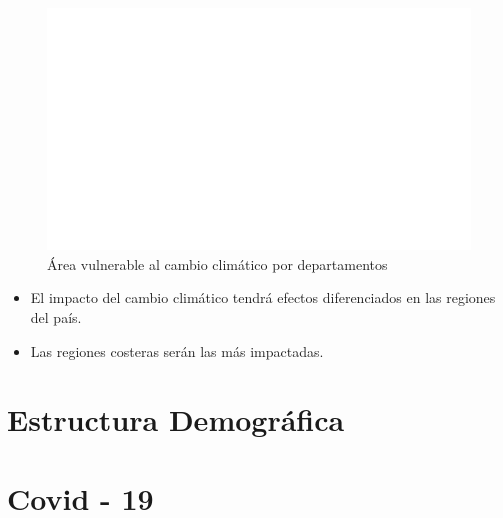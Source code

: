     \begin{figure}[H]
        \caption{Área vulnerable al cambio climático por departamentos \label{map_result_2} }
        \begin{center}
        \includegraphics[width=\textwidth,keepaspectratio]{img/var_299_map.png}
        \end{center}
    \end{figure}
            \begin{itemize}
                    \item El impacto del cambio climático tendrá efectos diferenciados en las regiones del país.
                    \item Las regiones costeras serán las más impactadas.
                    \end{itemize}

\section{Estructura Demográfica}

\section{Covid - 19}
